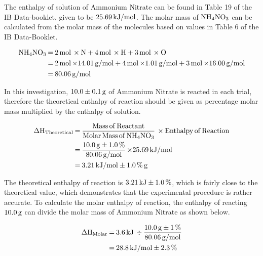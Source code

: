 \documentclass{article}
\begin{document}
\noindent
The enthalpy of solution of Ammonium Nitrate can be found in Table 19 of the IB Data-booklet, given to be $\ce{25.69 kJ/mol}$. The molar mass of $\ce{NH4NO3}$ can be calculated from the molar mass of the molecules based on values in Table 6 of the IB Data-Booklet.
\begin{tcolorbox}[title=Calculation of Molar Mass of $\ce{NH4No3}$]
\begin{equation}
    \begin{split}
        \ce{
        NH4NO3 &= 2 mol \times N + 4 mol \times H + 3mol \times O \\
        &= 2 mol \times} \ce{14.01 \si{g/mol} + 4mol \times} \ce{1.01 \si{g/mol} + 3mol \times} \ce{16.00 \si{g/mol} \\
        &= 80.06 \si{g/mol}
        }
    \end{split}
\end{equation}
\end{tcolorbox}
\noindent
In this investigation, $\ce{10.0 \pm 0.1 g}$ of Ammonium Nitrate is reacted in each trial, therefore the theoretical enthalpy of reaction should be given as percentage molar mass multiplied by the enthalpy of solution.
\begin{tcolorbox}[title=Calculation of Theoretical Enthalpy of Reaction ($\ce{\Delta H_{Theoretical}}$)]
\begin{equation}
\begin{split}
  \ce{
  \Delta H_{Theoretical} &= \frac{Mass of Reactant}{Molar Mass of NH4NO3} \times Enthalpy of Reaction \\
  &= \frac{10.0 g \pm 1.0\%}{80.06 g/mol} \times} \ce{25.69 kJ/mol \\
  &= 3.21 kJ/mol \pm} \ce{1.0\% g
  }  
\end{split}
\end{equation}
\end{tcolorbox}
\noindent
The theoretical enthalpy of reaction is $\ce{3.21 kJ \pm 1.0\%}$, which is fairly close to the theoretical value, which demonstrates that the experimental procedure is rather accurate. To calculate the molar enthalpy of reaction, the enthalpy of reacting $\ce{10.0g}$ can divide the molar mass of Ammonium Nitrate as shown below.
\begin{tcolorbox}[title=Calculation of Molar Enthalpy of Reaction ($\ce{\Delta H_{Molar}}$)]
\begin{equation}
    \begin{split}
        \ce{
        \Delta H_{Molar} &= 3.6 kJ \div \frac{10.0 g \pm 1\%}{80.06 g/mol} \\ 
        &= 28.8 kJ/mol \pm 2.3\%
        }
    \end{split}
\end{equation}
\end{tcolorbox}
\end{document}
